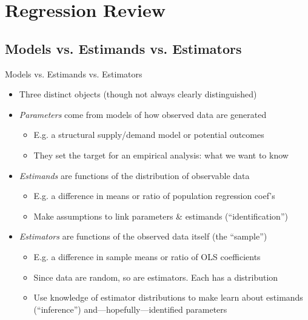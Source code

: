 \documentclass{beamer}
\begin{document}
\section{Regression Review}

\subsection{Models vs. Estimands vs. Estimators}
\begin{frame}{Models vs. Estimands vs. Estimators}
\begin{itemize}
\item Three distinct objects (though not always clearly distinguished) \pause{}\smallskip
\item \emph{Parameters} come from models of how observed data are generated\smallskip
\begin{itemize}
\item E.g. a structural supply/demand model or potential outcomes\smallskip
\item They set the target for an empirical analysis: what we want to know
\end{itemize}\pause{}\smallskip
\item \emph{Estimands} are functions of the distribution of observable data\pause{}\smallskip
\begin{itemize}
\item E.g. a difference in means or ratio of population regression coef's\smallskip
\item Make assumptions to link parameters \& estimands (``identification'')
\end{itemize}\pause{}\smallskip
\item \emph{Estimators} are functions of the observed data itself (the ``sample'')\pause{}\smallskip
\begin{itemize}
\item E.g. a difference in sample means or ratio of OLS coefficients\smallskip 
\item Since data are random, so are estimators. Each has a distribution\smallskip
\item Use knowledge of estimator distributions to make learn about estimands (``inference'') and---hopefully---identified parameters
\end{itemize}
\end{itemize}
\end{frame}
\end{document}
